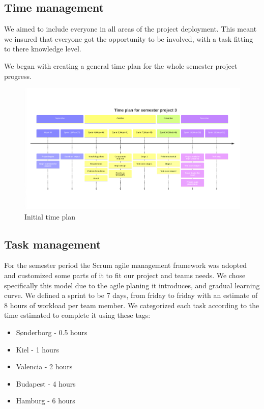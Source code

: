 \documentclass[../report.tex]{subfiles}
\begin{document}
\subsection{Time management}
We aimed to include everyone in all areas of the project deployment. This meant
we insured that everyone got the opportunity to be involved, with a task
fitting to there knowledge level.

We began with creating a general time plan for the whole semester project
progress.
\begin{figure}[H]
    \includegraphics[width=\textwidth]{Management/timeplan.png}
    \caption{Initial time plan}
\end{figure}

\subsection{Task management}

For the semester period the Scrum agile management framework was adopted and customized some parts of it to fit our project
and teams needs. We chose specifically this model due to the agile planing it introduces, and gradual
learning curve. We defined a sprint to be 7 days, from friday to friday with an estimate of 8 hours of
workload per team member. We categorized each task according to the time estimated to complete it
using these tags:

\begin{itemize}
    \item Sønderborg - 0.5 hours
    \item Kiel - 1 hours
    \item Valencia - 2 hours
    \item Budapest - 4 hours
    \item Hamburg -  6 hours
\end{itemize}
\end{document}
